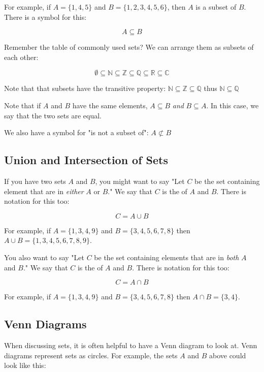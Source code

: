 For example, if $A = \{1,4,5\}$ and $B = \{1,2,3,4,5,6\}$, then $A$ is
a subset of $B$.  There is a symbol for this:

$$ A \subseteq B$$

Remember the table of commonly used sets?  We can arrange them as
subsets of each other:

$$\emptyset \subseteq \mathbb{N} \subseteq \mathbb{Z} \subseteq \mathbb{Q} \subseteq \mathbb{R} \subseteq \mathbb{C}$$

Note that that subsets have the transitive property: $\mathbb{N}
\subseteq \mathbb{Z} \subseteq \mathbb{Q}$ thus $\mathbb{N} \subseteq
\mathbb{Q}$

Note that if $A$ and $B$ have the same elements, $A \subseteq B$
\textit{ and } $B \subseteq A$. In this case, we say that the two sets
are equal.

We also have a symbol for "is not a subset of": $A \not\subset B$

\subsection{Union and Intersection of Sets}

If you have two sets $A$ and $B$, you might want to say "Let $C$ be
the set containing element that are in \textit{either} $A$ or $B$."
We say that $C$ is the  of $A$ and $B$.  There is
notation for this too:

$$C = A \cup B$$

For example,  if $A = \{1,3,4,9\}$ and $B = \{3,4,5,6,7,8\}$  then $A \cup B =  \{1,3,4,5,6,7,8,9\}$.

You also want to say "Let $C$ be the set containing elements that are
in \textit{both} $A$ and $B$."  We say that $C$ is the
 of $A$ and $B$.  There is notation for this
too:

$$C = A \cap B$$

For example,  if $A = \{1,3,4,9\}$ and $B = \{3,4,5,6,7,8\}$  then $A \cap B =  \{3,4\}$.

\subsection{Venn Diagrams}

When discussing sets, it is often helpful to have a Venn diagram to
look at.  Venn diagrams represent sets as circles. For example, the
sets $A$ and $B$ above could look like this:

